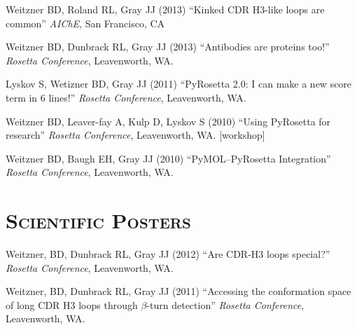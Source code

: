 \documentclass[12pt]{scrartcl}
\newcommand{\smallcapsspacing}[1]{{\addfontfeature{LetterSpace=5.0}#1}}
\renewcommand{\textsc}[1]{\smallcapsspacing{\scshape{#1}}}
\begin{document}
\vspace{0.75\baselineskip}

\noindent Weitzner BD, Roland RL, Gray JJ (2013) ``Kinked CDR H3-like loops are common'' \textit{AIChE}, San Francisco, CA

\vspace{0.75\baselineskip}

\noindent Weitzner BD, Dunbrack RL, Gray JJ (2013) ``Antibodies are proteins too!'' \textit{Rosetta Conference}, Leavenworth, WA.

\vspace{0.75\baselineskip}

\noindent Lyskov S, Wetizner BD, Gray JJ (2011) ``PyRosetta 2.0: I can make a new score term in 6 lines!'' \textit{Rosetta Conference}, Leavenworth, WA.

\vspace{0.75\baselineskip}

\noindent Weitzner BD, Leaver-fay A, Kulp D,  Lyskov S (2010) ``Using PyRosetta for research'' \textit{Rosetta Conference}, Leavenworth, WA. [workshop]

\vspace{0.75\baselineskip}

\noindent Weitzner BD, Baugh EH, Gray JJ (2010) ``PyMOL--PyRosetta Integration'' \textit{Rosetta Conference}, Leavenworth, WA.

\pagebreak
\section*{\textsc{Scientific Posters}}
\noindent Weitzner, BD, Dunbrack RL, Gray JJ (2012) ``Are CDR-H3 loops special?'' \textit{Rosetta Conference}, Leavenworth, WA.

\vspace{0.75\baselineskip}

\noindent Weitzner, BD, Dunbrack RL, Gray JJ (2011) ``Accessing the conformation space of long CDR H3 loops through $\beta$-turn detection'' \textit{Rosetta Conference}, Leavenworth, WA.
\end{document}
